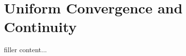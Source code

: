 \documentclass[../../templates/section]{subfiles}
\begin{document}
\section{Uniform Convergence and Continuity}\label{sec:uniform-convergence-and-continuity}

filler content...
\end{document}
